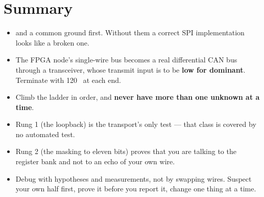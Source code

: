 \section*{Summary}

\begin{itemize}
  \item {} and a common ground first. Without them a correct SPI implementation looks
    like a broken one.
  \item The FPGA node's single-wire bus becomes a real differential CAN bus through a transceiver,
    whose transmit input is to be \textbf{low for dominant}. Terminate with 120~\textohm{} at each
    end.
  \item Climb the ladder in order, and \textbf{never have more than one unknown at a time}.
  \item Rung 1 (the loopback) is the transport's only test --- that class is covered by no
    automated test.
  \item Rung 2 (the masking to eleven bits) proves that you are talking to the register bank and
    not to an echo of your own wire.
  \item Debug with hypotheses and measurements, not by swapping wires. Suspect your own half
    first, prove it before you report it, change one thing at a time.
\end{itemize}
